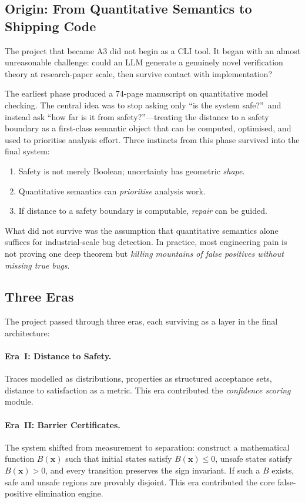 \documentclass[sigconf,review,anonymous]{acmart}
\begin{document}
\subsection{Origin: From Quantitative Semantics to Shipping Code}

The project that became \textsc{A3} did not begin as a CLI tool.
It began with an almost unreasonable challenge: could an LLM generate a genuinely novel verification theory at research-paper scale, then survive contact with implementation?

The earliest phase produced a 74-page manuscript on quantitative model checking.
The central idea was to stop asking only ``is the system safe?''\ and instead ask ``how far is it from safety?''---treating the distance to a safety boundary as a first-class semantic object that can be computed, optimised, and used to prioritise analysis effort.
Three instincts from this phase survived into the final system:
\begin{enumerate}
  \item Safety is not merely Boolean; uncertainty has geometric \emph{shape}.
  \item Quantitative semantics can \emph{prioritise} analysis work.
  \item If distance to a safety boundary is computable, \emph{repair} can be guided.
\end{enumerate}

What did not survive was the assumption that quantitative semantics alone suffices for industrial-scale bug detection.
In practice, most engineering pain is not proving one deep theorem but \emph{killing mountains of false positives without missing true bugs}.

\subsection{Three Eras}

The project passed through three eras, each surviving as a layer in the final architecture:

\paragraph{Era~I: Distance to Safety.}
Traces modelled as distributions, properties as structured acceptance sets, distance to satisfaction as a metric.
This era contributed the \emph{confidence scoring} module.

\paragraph{Era~II: Barrier Certificates.}
The system shifted from measurement to separation:
construct a mathematical function $B(\mathbf{x})$ such that initial states satisfy $B(\mathbf{x}) \leq 0$, unsafe states satisfy $B(\mathbf{x}) > 0$, and every transition preserves the sign invariant.
If such a $B$ exists, safe and unsafe regions are provably disjoint.
This era contributed the core false-positive elimination engine.
\end{document}
